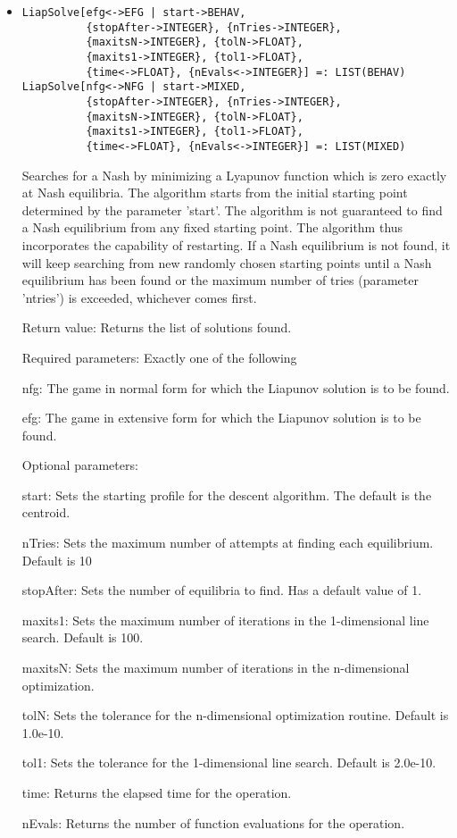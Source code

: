 \begin{itemize}
\item
\protect \large \begin{verbatim}
LiapSolve[efg<->EFG | start->BEHAV, 
          {stopAfter->INTEGER}, {nTries->INTEGER},
          {maxitsN->INTEGER}, {tolN->FLOAT},
          {maxits1->INTEGER}, {tol1->FLOAT},
          {time<->FLOAT}, {nEvals<->INTEGER}] =: LIST(BEHAV)
LiapSolve[nfg<->NFG | start->MIXED, 
          {stopAfter->INTEGER}, {nTries->INTEGER},
          {maxitsN->INTEGER}, {tolN->FLOAT},
          {maxits1->INTEGER}, {tol1->FLOAT},
          {time<->FLOAT}, {nEvals<->INTEGER}] =: LIST(MIXED)
\end{verbatim}\normalsize


\bd
Searches for a Nash by minimizing a Lyapunov function which is zero
exactly at Nash equilibria.  The algorithm starts from the initial
starting point determined by the parameter 'start'.  The algorithm is
not guaranteed to find a Nash equilibrium from any fixed starting
point.  The algorithm thus incorporates the capability of restarting.
If a Nash equilibrium is not found, it will keep searching from new
randomly chosen starting points until a Nash equilibrium has been
found or the maximum number of tries (parameter 'ntries') is exceeded,
whichever comes first.
\item
[Return value:] Returns the list of solutions found.
\item
[Required parameters:] Exactly one of the following \hfil\null

\bd
\item
[nfg:] The game in normal form for which the Liapunov solution is to
be found.
\item
[efg:] The game in extensive form for which the Liapunov solution is
to be found.
\ed

\item
[Optional parameters:]\hfil\null

\bd
\item
[start:] Sets the starting profile for the descent algorithm.  The
default is the centroid.
\item
[nTries:] Sets the maximum number of attempts at finding each
equilibrium. Default is 10
\item
[stopAfter:] Sets the number of equilibria to find.  Has a default
value of 1.  
\item
[maxits1:] Sets the maximum number of iterations in the
1-dimensional line search.  Default is 100.
\item
[maxitsN:] Sets the maximum number of iterations in the
n-dimensional optimization.  
\item
[tolN:] Sets the tolerance for the n-dimensional optimization
routine.  Default is 1.0e-10.
\item
[tol1:] Sets the tolerance for the 1-dimensional line search.
Default is 2.0e-10.
\item
[time:] Returns the elapsed time for the operation.
\item
[nEvals:] Returns the number of function evaluations for the operation.
\ed
\ed




\end{itemize}
